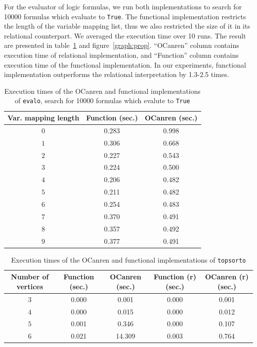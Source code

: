 For the evaluator of logic formulas, we run both implementations to search for 10000 formulas which evaluate to \lstinline{True}.
The functional implementation restricts the length of the variable mapping list, thus we also restricted the size of it in its relational counterpart.
We averaged the execution time over 10 runs.
The result are presented in table~\ref{tbl:prop} and figure~\ref{graph:prop}.
``OCanren'' column contains execution time of relational implementation, and ``Function'' column contains execution time of the functional implementation.
In our experiments, functional implementation outperforms the relational interpretation by 1.3-2.5 times.


\begin{table}
  \begin{tabular}{ccc}
    \toprule
    Var. mapping length&Function (sec.)&OCanren (sec.)\\
    \midrule
    $0$ & 0.283 & 0.998 \\
    $1$ & 0.306 & 0.668 \\
    $2$ & 0.227 & 0.543 \\
    $3$ & 0.224 & 0.500 \\
    $4$ & 0.206 & 0.482 \\
    $5$ & 0.211 & 0.482 \\
    $6$ & 0.254 & 0.483 \\
    $7$ & 0.370 & 0.491 \\
    $8$ & 0.357 & 0.492 \\
    $9$ & 0.377 & 0.491 \\
  \bottomrule
  \end{tabular}
  \caption{Execution times of the OCanren and functional implementations of \lstinline{evalo}, search for 10000 formulas which evalute to \lstinline{True}}
  \label{tbl:prop}
\end{table}

\begin{table}
  \begin{tabular}{ccccc}
    \toprule
    Number of vertices&Function (sec.)&OCanren (sec.)&Function (r) (sec.)&OCanren (r) (sec.)\\
    \midrule
    $3$ & 0.000 & 0.001  & 0.000 & 0.001 \\
    $4$ & 0.000 & 0.015  & 0.000 & 0.012 \\
    $5$ & 0.001 & 0.346  & 0.000 & 0.107 \\
    $6$ & 0.021 & 14.309 & 0.003 & 0.764 \\
    \bottomrule
  \end{tabular}
  \caption{Execution times of the OCanren and functional implementations of \lstinline{topsorto}}
  \label{tbl:sort}
\end{table}

